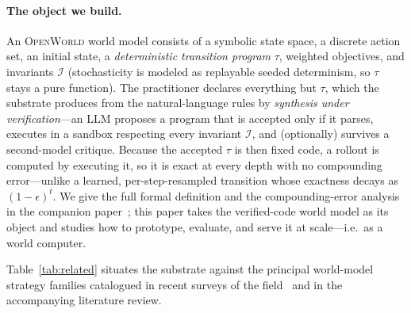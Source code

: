 \documentclass[11pt]{article}
\newcommand{\openworld}{\textsc{OpenWorld}}
\begin{document}
\paragraph{The object we build.} An \openworld{} world model consists of a
symbolic state space, a discrete action set, an initial state, a
\emph{deterministic transition program} $\tau$, weighted objectives, and
invariants $\mathcal{I}$ (stochasticity is modeled as replayable seeded
determinism, so $\tau$ stays a pure function). The practitioner declares
everything but $\tau$, which the substrate produces from the natural-language
rules by \emph{synthesis under verification}---an LLM proposes a program that is
accepted only if it parses, executes in a sandbox respecting every invariant
$\mathcal{I}$, and (optionally) survives a second-model critique. Because the
accepted $\tau$ is then fixed code, a rollout is computed by executing it, so it
is exact at every depth with no compounding error---unlike a learned,
per-step-resampled transition whose exactness decays as $(1-\epsilon)^t$. We give
the full formal definition and the compounding-error analysis in the companion
paper~\cite{openworld_wtc}; this paper takes the verified-code world model as its
object and studies how to prototype, evaluate, and serve it at scale---i.e.\ as a
world computer.

Table~\ref{tab:related} situates the substrate against the principal
world-model strategy families catalogued in recent surveys of the
field~\cite{ding2024world} and in the accompanying literature review.
\end{document}

